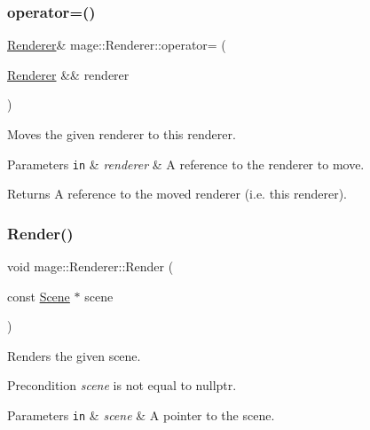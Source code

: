 \subsubsection{\texorpdfstring{operator=()}{operator=()}\hspace{0.1cm}{\footnotesize\ttfamily [2/2]}}
{\footnotesize\ttfamily \hyperlink{classmage_1_1_renderer}{Renderer}\& mage\+::\+Renderer\+::operator= (\begin{DoxyParamCaption}\item[{\hyperlink{classmage_1_1_renderer}{Renderer} \&\&}]{renderer }\end{DoxyParamCaption})\hspace{0.3cm}{\ttfamily [delete]}}

Moves the given renderer to this renderer.


\begin{DoxyParams}[1]{Parameters}
\mbox{\tt in}  & {\em renderer} & A reference to the renderer to move. \\
\hline
\end{DoxyParams}
\begin{DoxyReturn}{Returns}
A reference to the moved renderer (i.\+e. this renderer). 
\end{DoxyReturn}
\hypertarget{classmage_1_1_renderer_af18ff4c3d4a9c6d9ec9b30fdb5ad3455}{}\label{classmage_1_1_renderer_af18ff4c3d4a9c6d9ec9b30fdb5ad3455} 
\subsubsection{\texorpdfstring{Render()}{Render()}}
{\footnotesize\ttfamily void mage\+::\+Renderer\+::\+Render (\begin{DoxyParamCaption}\item[{const \hyperlink{classmage_1_1_scene}{Scene} $\ast$}]{scene }\end{DoxyParamCaption})}

Renders the given scene.

\begin{DoxyPrecond}{Precondition}
{\itshape scene} is not equal to {\ttfamily nullptr}. 
\end{DoxyPrecond}

\begin{DoxyParams}[1]{Parameters}
\mbox{\tt in}  & {\em scene} & A pointer to the scene. \\
\hline
\end{DoxyParams}


